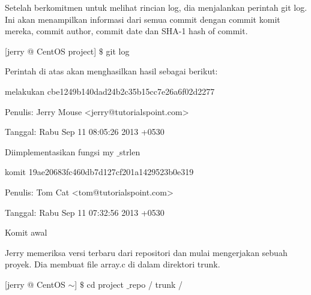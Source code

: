 \noindent 
Setelah berkomitmen untuk melihat rincian log, dia menjalankan perintah git log. Ini akan menampilkan informasi dari semua commit dengan commit komit mereka, commit author, commit date dan SHA-1 hash of commit. \par
\vspace{\baselineskip}
\noindent 
 \hspace*{0.5in} [jerry @ CentOS project]  $  \$  $ git log \par
 \vspace{\baselineskip}
\noindent 
Perintah di atas akan menghasilkan hasil sebagai berikut: \par
\noindent 
 \hspace*{0.5in} melakukan cbe1249b140dad24b2c35b15cc7e26a6f02d2277 \par
\noindent 
 \hspace*{0.5in} Penulis: Jerry Mouse <jerry@tutorialspoint.com> \par
\noindent 
 \hspace*{0.5in} Tanggal: Rabu Sep 11 08:05:26 2013 +0530 \par
\noindent 
 \hspace*{0.5in} Diimplementasikan fungsi my $  \_  $strlen \par
 \vspace{\baselineskip}
\noindent 
 \hspace*{0.5in}  \hspace*{0.5in} komit 19ae20683fc460db7d127cf201a1429523b0e319 \par
\noindent 
 \hspace*{0.5in}  \hspace*{0.5in} Penulis: Tom Cat <tom@tutorialspoint.com> \par
\noindent 
 \hspace*{0.5in}  \hspace*{0.5in} Tanggal: Rabu Sep 11 07:32:56 2013 +0530 \par
 \vspace{\baselineskip}
\noindent 
Komit awal \par
\noindent 
 \hspace*{0.5in} Jerry memeriksa versi terbaru dari repositori dan mulai mengerjakan sebuah proyek. Dia membuat file array.c di dalam direktori trunk. \par
 \vspace{\baselineskip}
 \vspace{\baselineskip}
\noindent 
 \hspace*{0.5in} [jerry @ CentOS  $  \sim  $]  $  \$  $ cd project $  \_  $repo / trunk / \par
